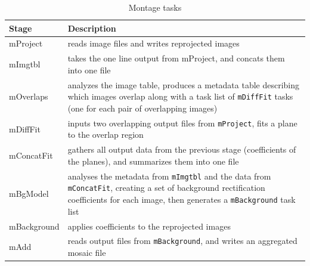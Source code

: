 \documentclass{sig-alternate}
\begin{document}
\begin{table}[h]
    \caption{Montage tasks}
   \begin{small}
    \begin{tabular}{ | p{1.8cm} | p{5.7cm} |}
    \hline
    Stage & Description  \\ \hline \hline
    mProject &  reads image files and writes reprojected images\\ \hline
    mImgtbl &  takes the one line output from mProject, and concats them into one file\\ \hline
    mOverlaps &  analyzes the image table, produces a metadata table describing which images overlap along with a task list of {\tt mDiffFit} tasks (one for each pair of overlapping images) \\ \hline
    mDiffFit &  inputs two overlapping output files from {\tt mProject}, fits a plane to the overlap region \\ \hline
    mConcatFit &  gathers all output data from the previous stage (coefficients of the planes), and summarizes them into one file \\ \hline
    mBgModel &  analyses the metadata from {\tt mImgtbl} and the data from {\tt mConcatFit}, creating a set of background rectification coefficients for each image, then generates a {\tt mBackground} task list \\ \hline
    mBackground &  applies coefficients to the reprojected images\\ \hline
    mAdd &  reads output files from {\tt mBackground}, and writes an aggregated mosaic file \\ \hline
    \end{tabular}
    \end{small}
      \label{tb:Montage}
\end{table}
\end{document}
